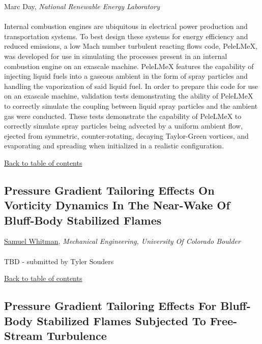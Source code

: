 {Marc Day}, \textit{National Renewable Energy Laboratory}\\ 
\vspace{-0.1 in} \\ 
\noindent Internal combustion engines are ubiquitous in electrical power production and transportation systems. To best design these systems for energy efficiency and reduced emissions, a low Mach number turbulent reacting flows code, PeleLMeX, was developed for use in simulating the processes present in an internal combustion engine on an exascale machine. PeleLMeX features the capability of injecting liquid fuels into a gaseous ambient in the form of spray particles and handling the vaporization of said liquid fuel. In order to prepare this code for use on an exascale machine, validation tests demonstrating the ability of PeleLMeX to correctly simulate the coupling between liquid spray particles and the ambient gas were conducted. These tests demonstrate the capability of PeleLMeX to correctly simulate spray particles being advected by a uniform ambient flow, ejected from symmetric, counter-rotating, decaying Taylor-Green vortices, and evaporating and spreading when initialized in a realistic configuration.  \\ 
\begin{flushright}\vspace{-0.2 in}\hyperlink{toc}{Back to table of contents}\end{flushright}\vspace{-0.2 in}
\hypertarget{SamuelWhitman}{\subsection*{\color{CUGOLD} Pressure Gradient Tailoring Effects On Vorticity Dynamics In The Near-Wake Of Bluff-Body Stabilized Flames}} \vsp 
\underline{Samuel Whitman}, \textit{Mechanical Engineering, University Of Colorado Boulder}\\ 
\vspace{-0.1 in} \\ 
\noindent TBD - submitted by Tyler Souders \\ 
\begin{flushright}\vspace{-0.2 in}\hyperlink{toc}{Back to table of contents}\end{flushright}\vspace{-0.2 in}
\hypertarget{TylerSouders}{\subsection*{\color{CUGOLD} Pressure Gradient Tailoring Effects For Bluff-Body Stabilized Flames Subjected To Free-Stream Turbulence}} \vsp 
